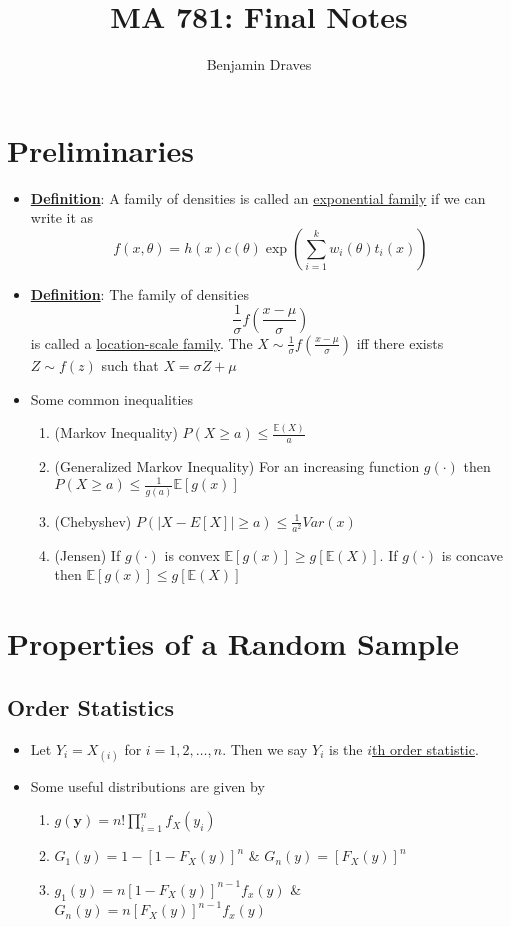 \documentclass{article}
\title{MA 781: Final Notes}
\author{
  Benjamin Draves
}
\newcommand{\E}{{\mathbb{E}}}
\begin{document}
\maketitle
\section{Preliminaries}%
\begin{itemize}
\item \underline{\textbf{Definition}}: A family of densities is called an \underline{exponential family} if we can write it as $$f(x,\theta) = h(x)c(\theta)\exp\left(\sum_{i=1}^{k}w_i(\theta)t_i(x)\right)$$
\item \underline{\textbf{Definition}}: The family of densities $$\frac{1}{\sigma}f(\frac{x-\mu}{\sigma})$$ is called a \underline{location-scale family}. The $X\sim \frac{1}{\sigma}f(\frac{x-\mu}{\sigma})$ iff there exists $Z\sim f(z)$ such that $X = \sigma Z + \mu$ 
\item Some common inequalities
\begin{enumerate}
\item (Markov Inequality) $P(X\geq a)\leq \frac{\E(X)}{a}$
\item (Generalized Markov Inequality) For an increasing function $g(\cdot)$ then $P(X\geq a)\leq \frac{1}{g(a)}\E[g(x)]$
\item (Chebyshev) $P(|X-E[X]|\geq a)\leq \frac{1}{a^2}Var(x)$
\item (Jensen) If $g(\cdot)$ is convex $\E[g(x)]\geq g[\E(X)]$. If $g(\cdot)$ is concave then $\E[g(x)]\leq g[\E(X)]$
\end{enumerate}
\end{itemize}


\section{Properties of a Random Sample}%

\subsection{Order Statistics}
\begin{itemize}
\item Let $Y_i = X_{(i)}$ for $i = 1,2, \ldots, n$. Then we say $Y_i$ is the \underline{$i$th order statistic}. 
\item Some useful distributions are given by 
\begin{enumerate}
\item $g(\textbf{y}) = n!\prod_{i=1}^nf_X(y_i)$
\item $G_1(y) = 1 - [1 - F_X(y)]^n$ \hspace{1em}\&\hspace{1em} $G_n(y) = [F_X(y)]^n$
\item $g_1(y) = n[1 - F_X(y)]^{n-1}f_x(y)$ \hspace{1em}\&\hspace{1em} $G_n(y) = n[F_X(y)]^{n-1}f_x(y)$
\end{enumerate}
\end{itemize}
\end{document}
